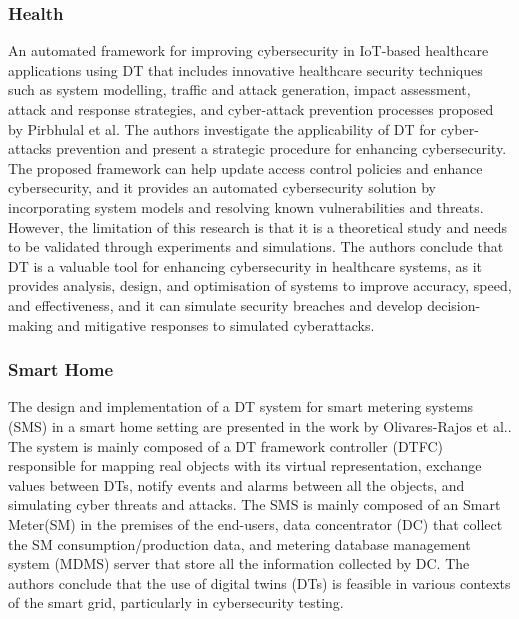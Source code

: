 \subsubsection{Health}
An automated framework for improving cybersecurity in IoT-based healthcare applications using DT that includes innovative healthcare security techniques such as system modelling, traffic and attack generation, impact assessment, attack and response strategies, and cyber-attack prevention processes proposed by Pirbhulal et al.\cite{pirbhulalNovelFrameworkReinforcing2022} The authors investigate the applicability of DT for cyber-attacks prevention and present a strategic procedure for enhancing cybersecurity. The proposed framework can help update access control policies and enhance cybersecurity, and it provides an automated cybersecurity solution by incorporating system models and resolving known vulnerabilities and threats. However, the limitation of this research is that it is a theoretical study and needs to be validated through experiments and simulations. The authors conclude that DT is a valuable tool for enhancing cybersecurity in healthcare systems, as it provides analysis, design, and optimisation of systems to improve accuracy, speed, and effectiveness, and it can simulate security breaches and develop decision-making and mitigative responses to simulated cyberattacks. 

\subsubsection{Smart Home}
The design and implementation of a DT system for smart metering systems (SMS) in a smart home setting are presented in the work by Olivares-Rajos et al.\cite{olivares-rojasCybersecuritySmartGrid2022}. The system is mainly composed of a DT framework controller (DTFC) responsible for mapping real objects with its virtual representation, exchange values between DTs, notify events and alarms between all the objects, and simulating cyber threats and attacks. The SMS is mainly composed of an Smart Meter(SM) in the premises of the end-users, data concentrator (DC) that collect the SM consumption/production data, and metering database management system (MDMS) server that store all the information collected by DC. The authors conclude that the use of digital twins (DTs) is feasible in various contexts of the smart grid, particularly in cybersecurity testing.

